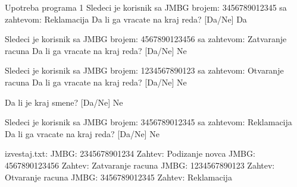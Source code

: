 \begin{Exercise}[label=606]
\begin{maxitest}
\begin{test}{Upotreba programa 1}
Sledeci je korisnik sa JMBG brojem: 3456789012345
sa zahtevom: Reklamacija
        Da li ga vracate na kraj reda? [Da/Ne] Da

Sledeci je korisnik sa JMBG brojem: 4567890123456
sa zahtevom: Zatvaranje racuna
        Da li ga vracate na kraj reda? [Da/Ne] Ne

Sledeci je korisnik sa JMBG brojem: 1234567890123
sa zahtevom: Otvaranje racuna
        Da li ga vracate na kraj reda? [Da/Ne] Ne

Da li je kraj smene? [Da/Ne] Ne

Sledeci je korisnik sa JMBG brojem: 3456789012345
sa zahtevom: Reklamacija
        Da li ga vracate na kraj reda? [Da/Ne] Ne

izvestaj.txt: 
  JMBG: 2345678901234     Zahtev: Podizanje novca
  JMBG: 4567890123456     Zahtev: Zatvaranje racuna
  JMBG: 1234567890123     Zahtev: Otvaranje racuna
  JMBG: 3456789012345     Zahtev: Reklamacija
\end{test}
\end{maxitest}
\end{Exercise}
\begin{Answer}[ref=606]
\end{Answer}

